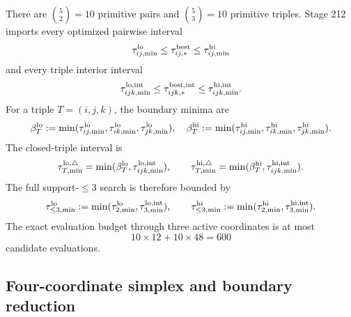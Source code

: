 There are \(\binom52=10\) primitive pairs and \(\binom53=10\) primitive triples.  Stage 212 imports every optimized pairwise interval
\begin{equation}
\label{eq:part06-pairwise-interval-import}
\tau_{ij,\min}^{\rm lo}\le\tau_{ij,*}^{\rm best}\le\tau_{ij,\min}^{\rm hi}
\end{equation}
and every triple interior interval
\begin{equation}
\label{eq:part06-triple-interior-interval-import}
\tau_{ijk,\min}^{\rm lo,int}\le\tau_{ijk,*}^{\rm best,int}\le\tau_{ijk,\min}^{\rm hi,int}.
\end{equation}
For a triple \(T=(i,j,k)\), the boundary minima are
\begin{equation}
\label{eq:part06-triple-boundary-minima}
\beta_T^{\rm lo}:=\min(\tau_{ij,\min}^{\rm lo},\tau_{ik,\min}^{\rm lo},\tau_{jk,\min}^{\rm lo}),
\quad
\beta_T^{\rm hi}:=\min(\tau_{ij,\min}^{\rm hi},\tau_{ik,\min}^{\rm hi},\tau_{jk,\min}^{\rm hi}).
\end{equation}
The closed-triple interval is
\begin{equation}
\label{eq:part06-triple-closed-interval}
\tau_{T,\min}^{\rm lo,\triangle}=\min(\beta_T^{\rm lo},\tau_{ijk,\min}^{\rm lo,int}),
\qquad
\tau_{T,\min}^{\rm hi,\triangle}=\min(\beta_T^{\rm hi},\tau_{ijk,\min}^{\rm hi,int}).
\end{equation}
The full support-\(\le3\) search is therefore bounded by
\begin{equation}
\label{eq:part06-support-le3-interval}
\tau_{\le3,\min}^{\rm lo}:=\min(\tau_{2,\min}^{\rm lo},\tau_{3,\min}^{\rm lo,int}),
\qquad
\tau_{\le3,\min}^{\rm hi}:=\min(\tau_{2,\min}^{\rm hi},\tau_{3,\min}^{\rm hi,int}).
\end{equation}
The exact evaluation budget through three active coordinates is at most
\begin{equation}
\label{eq:part06-budget-le3}
10\times12+10\times48=600
\end{equation}
candidate evaluations.

\subsection{Four-coordinate simplex and boundary reduction}
\label{subsec:part06-four-simplex-boundary-reduction}

